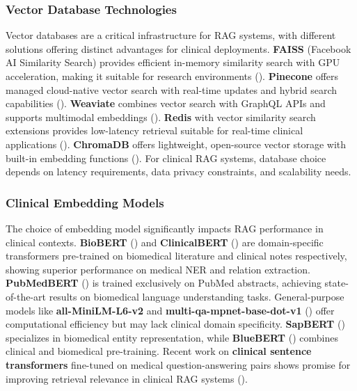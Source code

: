 \subsubsection{Vector Database Technologies}
Vector databases are a critical infrastructure for RAG systems, with different solutions offering distinct advantages for clinical deployments. \textbf{FAISS} (Facebook AI Similarity Search) provides efficient in-memory similarity search with GPU acceleration, making it suitable for research environments (\citep{douze2025faiss}). \textbf{Pinecone} offers managed cloud-native vector search with real-time updates and hybrid search capabilities (\citep{pinecone2023}). \textbf{Weaviate} combines vector search with GraphQL APIs and supports multimodal embeddings (\citep{weaviate2023}). \textbf{Redis} with vector similarity search extensions provides low-latency retrieval suitable for real-time clinical applications (\citep{redis2023vector}). \textbf{ChromaDB} offers lightweight, open-source vector storage with built-in embedding functions (\citep{chromadb2023}). For clinical RAG systems, database choice depends on latency requirements, data privacy constraints, and scalability needs.

\subsubsection{Clinical Embedding Models}
The choice of embedding model significantly impacts RAG performance in clinical contexts. \textbf{BioBERT} (\citep{lee2020biobert}) and \textbf{ClinicalBERT} (\citep{alsentzer2019clinicalbert}) are domain-specific transformers pre-trained on biomedical literature and clinical notes respectively, showing superior performance on medical NER and relation extraction. \textbf{PubMedBERT} (\citep{gu2021pubmedbert}) is trained exclusively on PubMed abstracts, achieving state-of-the-art results on biomedical language understanding tasks. General-purpose models like \textbf{all-MiniLM-L6-v2} and \textbf{multi-qa-mpnet-base-dot-v1} (\citep{reimers2019sentencebert}) offer computational efficiency but may lack clinical domain specificity. \textbf{SapBERT} (\citep{liu2021sapbert}) specializes in biomedical entity representation, while \textbf{BlueBERT} (\citep{peng2019bluebert}) combines clinical and biomedical pre-training. Recent work on \textbf{clinical sentence transformers} fine-tuned on medical question-answering pairs shows promise for improving retrieval relevance in clinical RAG systems (\citep{zhang2023clinical}).

